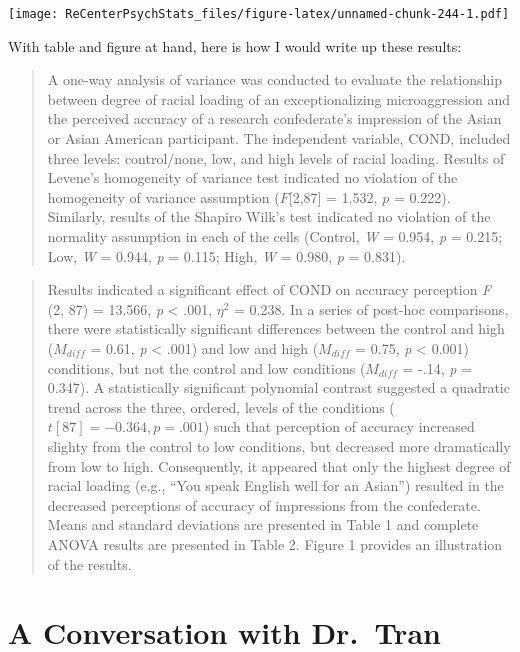 \documentclass[
  11pt,
]{book}
\begin{document}
\texttt{[image: ReCenterPsychStats\_files/figure-latex/unnamed-chunk-244-1.pdf]}

With table and figure at hand, here is how I would write up these results:

\begin{quote}
A one-way analysis of variance was conducted to evaluate the relationship between degree of racial loading of an exceptionalizing microaggression and the perceived accuracy of a research confederate's impression of the Asian or Asian American participant. The independent variable, COND, included three levels: control/none, low, and high levels of racial loading. Results of Levene's homogeneity of variance test indicated no violation of the homogeneity of variance assumption (\(F\){[}2,87{]} = 1.532, \(p\) = 0.222). Similarly, results of the Shapiro Wilk's test indicated no violation of the normality assumption in each of the cells (Control, \emph{W} = 0.954, \emph{p} = 0.215; Low, \emph{W} = 0.944, \emph{p} = 0.115; High, \emph{W} = 0.980, \emph{p} = 0.831).
\end{quote}

\begin{quote}
Results indicated a significant effect of COND on accuracy perception \emph{F} (2, 87) = 13.566, \emph{p} \textless{} .001, \(\eta^2\) = 0.238. In a series of post-hoc comparisons, there were statistically significant differences between the control and high (\(M_{diff}\) = 0.61, \emph{p} \textless{} .001) and low and high (\(M_{diff}\) = 0.75, \emph{p} \textless{} 0.001) conditions, but not the control and low conditions (\(M_{diff}\) = -.14, \emph{p} = 0.347). A statistically significant polynomial contrast suggested a quadratic trend across the three, ordered, levels of the conditions (\(t[87] = -0.364, p = .001\)) such that perception of accuracy increased slighty from the control to low conditions, but decreased more dramatically from low to high. Consequently, it appeared that only the highest degree of racial loading (e.g., ``You speak English well for an Asian'') resulted in the decreased perceptions of accuracy of impressions from the confederate. Means and standard deviations are presented in Table 1 and complete ANOVA results are presented in Table 2. Figure 1 provides an illustration of the results.
\end{quote}

\hypertarget{a-conversation-with-dr.-tran}{%
\section{A Conversation with Dr.~Tran}\label{a-conversation-with-dr.-tran}}
\end{document}
